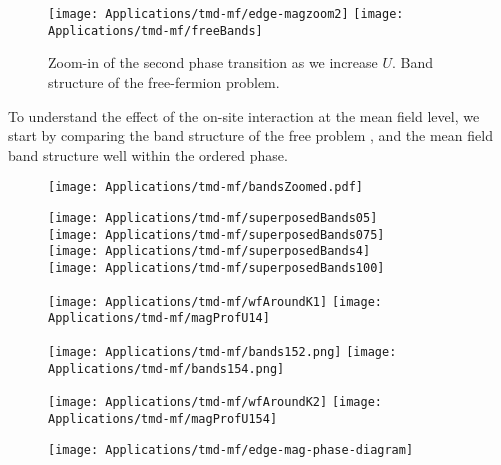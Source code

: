 \begin{figure}[H]
\hspace{0.2cm}
\texttt{[image: Applications/tmd-mf/edge-magzoom2]}
\texttt{[image: Applications/tmd-mf/freeBands]}
	\caption[Zoom-in of the second phase transition as we increase $U$. Band structure of the free-fermion problem.]{Zoom-in of the second phase transition as we increase $U$. Band structure of the free-fermion problem.}
	\label{fig:freeBands}
\end{figure}
To understand the effect of the on-site interaction at the mean field level, we start by comparing the band structure of the free problem , and the mean field band structure well within the ordered phase.
\begin{figure}[H]
\centering
\texttt{[image: Applications/tmd-mf/bandsZoomed.pdf]}
	\caption[]{}
	\label{fig:bandsZoomed}
\end{figure}
\begin{figure}[H]
\centering
\texttt{[image: Applications/tmd-mf/superposedBands05]} \\
\texttt{[image: Applications/tmd-mf/superposedBands075]} \\
\texttt{[image: Applications/tmd-mf/superposedBands4]} \\
\texttt{[image: Applications/tmd-mf/superposedBands100]} \\
	\caption[]{}
	\label{fig:band-structures}
\end{figure}
\begin{figure}[H]
\hspace{1cm}
\texttt{[image: Applications/tmd-mf/wfAroundK1]}
\texttt{[image: Applications/tmd-mf/magProfU14]}
	\caption[]{}
	\label{fig:wfs}
\end{figure}
\begin{figure}[H]
\hspace{1.2cm}
\texttt{[image: Applications/tmd-mf/bands152.png]}
\hspace{4mm}
\texttt{[image: Applications/tmd-mf/bands154.png]}
	\caption[]{}
	\label{fig:wfs}
\end{figure}
\begin{figure}[H]
\hspace{1cm}
\texttt{[image: Applications/tmd-mf/wfAroundK2]}
\texttt{[image: Applications/tmd-mf/magProfU154]}
	\caption[]{}
	\label{fig:wfs}
\end{figure}
\begin{figure}[H]
\centering
\texttt{[image: Applications/tmd-mf/edge-mag-phase-diagram]}
	\caption[]{}
	\label{fig:wfs}
\end{figure}